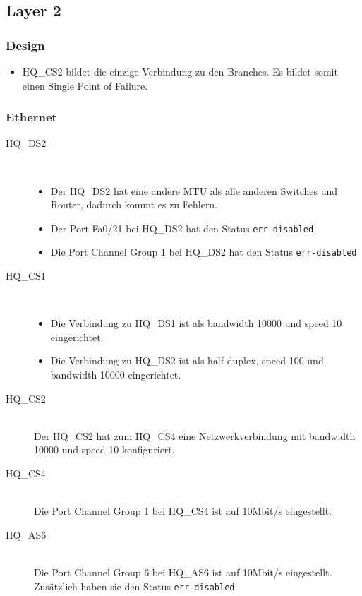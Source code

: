 \subsection{Layer 2}
\subsubsection{Design}
\begin{itemize}
	\item HQ\_CS2 bildet die einzige Verbindung zu den Branches. Es bildet somit einen Single Point of Failure.
\end{itemize}

\subsubsection{Ethernet}

\begin{description}
	\item[HQ\_DS2] \hfill \\
	  \begin{itemize}
	    \item Der HQ\_DS2 hat eine andere MTU als alle anderen Switches und Router, dadurch kommt es zu Fehlern.
	    \item Der Port Fa0/21 bei HQ\_DS2 hat den Status \lstinline|err-disabled|
	    \item Die Port Channel Group 1 bei HQ\_DS2 hat den Status \lstinline|err-disabled|
          \end{itemize}
	\item[HQ\_CS1] \hfill \\
		\begin{itemize}
			\item Die Verbindung zu HQ\_DS1 ist als bandwidth 10000 und speed 10 eingerichtet.
			\item Die Verbindung zu HQ\_DS2 ist als half duplex, speed 100 und bandwidth 10000 eingerichtet.
		\end{itemize}
	\item[HQ\_CS2] \hfill \\
	 Der HQ\_CS2 hat zum HQ\_CS4 eine Netzwerkverbindung mit bandwidth 10000 und speed 10 konfiguriert.
	\item[HQ\_CS4] \hfill \\
		Die Port Channel Group 1 bei HQ\_CS4 ist auf 10Mbit/s eingestellt. 
	\item[HQ\_AS6] \hfill \\
		Die Port Channel Group 6 bei HQ\_AS6 ist auf 10Mbit/s eingestellt. Zusätzlich haben sie den Status \lstinline|err-disabled|
\end{description}

